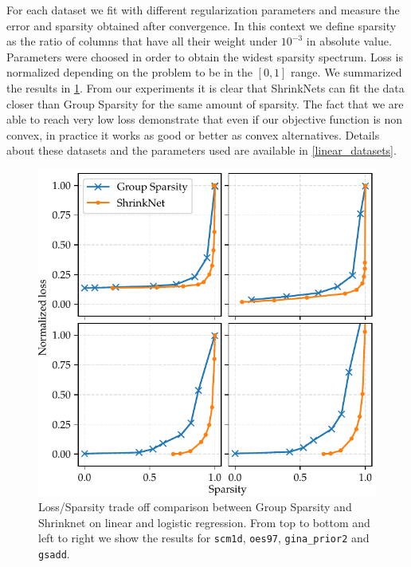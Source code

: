 \documentclass{article}
\begin{document}
For each dataset we fit with different regularization parameters and measure
the error and sparsity obtained after convergence. In this context we define sparsity as the ratio of columns that have all their weight under $10^{-3}$ in absolute value. Parameters were choosed in
order to obtain the widest sparsity spectrum. Loss is normalized depending on the problem to be in the $[0, 1]$ range. We summarized the results in
\cref{sparsity_accuracy}. From our experiments it is clear that ShrinkNets can fit the data closer than Group Sparsity for the same amount of sparsity. The fact that we are able to reach very low loss demonstrate that even if our objective function is non convex, in practice it works as good or better as convex alternatives. Details about these datasets and the parameters used
are available in \cref{linear_datasets}.

\begin{figure}
\begin{center}
\includegraphics[height=0.97\columnwidth]{regressions}
\vspace*{-5mm}
\caption{\label{sparsity_accuracy}Loss/Sparsity trade off comparison between Group Sparsity and Shrinknet on linear and logistic regression. From top to bottom and left to right we show the results for \texttt{scm1d}, \texttt{oes97}, \texttt{gina\_prior2} and \texttt{gsadd}.}

\end{center}
\vspace*{-4mm}
\end{figure}
\end{document}
